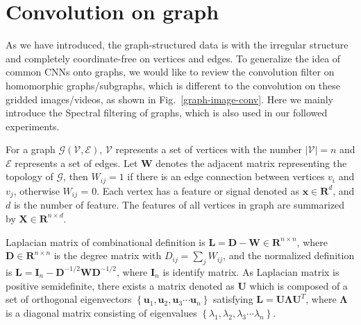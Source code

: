 \documentclass[journal]{IEEEtran}
\begin{document}
\begin{figure*}[ht]
	\centering
	\vspace{-1em}
	\caption{Different convolution operations on graph (left) and gridded image (right) samples.
	(a) shows the 1-localized convolution on graph data, where the red node has 6 adjacencies, and the green node has 3 adjacencies. In the process of convolution, they use the features of the 6 and 3 nodes respectively, in addition to the feature of their own nodes. 	
	(b) shows the convolution operation on the regular gridded data (e.g., images and videos). As long as a fixed-size convolution kernel is given, the convolution kernel will slid from left-to-right and top-to-bottom, all vertices can be then convolved once.}
	\label{graph-image-conv}
	\vspace{-1em}
\end{figure*}

\section{Convolution on graph}
\label{sec:Convolution on graph}

As we have introduced, the graph-structured data is with the irregular structure and completely coordinate-free on vertices and edges.
To generalize the idea of common CNNs onto graphs, we would like to review the convolution filter on homomorphic graphs/subgraphs, which is different to the convolution on these gridded images/videos, as shown in Fig.~\ref{graph-image-conv}.
Here we mainly introduce the Spectral filtering of graphs, which is also used in our followed experiments.

For a graph $\mathcal{G} \left(\mathcal{V},\mathcal{E} \right)$, $\mathcal{V}$ represents a set of vertices with the number $|\mathcal{V} |= n $ and $\mathcal{E}$ represents a set of edges.  Let $\mathbf{W}$ denotes the adjacent matrix representing the topology of $\mathcal{G}$, then $W_{ij} = 1$ if  there is an edge connection between vertices $v_i$ and $v_j$,  otherwise $W_{ij}$ = 0. Each vertex has a feature or signal denoted as  $\mathbf{x}\in\mathbf{R}^{d}$, and $d$ is the number of feature. The features of all vertices in graph are summarized by $\mathbf{X}\in\mathbf{R}^{{n}\times{d}}$.



Laplacian matrix of combinational definition is $\mathbf{L=D-W}\in\mathbf{R}^{n \times n}$, where $\mathbf{D} \in \mathbf{R}^{n \times n}$ is the degree matrix with $D_{ij} = \sum_{j}W_{ij}$, and the normalized definition is $\mathbf{L=I}_{n}-\mathbf{D}^{{-1/2}}\mathbf{W} \mathbf{D}^{-1/2}$, where $\mathbf{I}_{n}$ is identify matrix. As Laplacian matrix is positive semidefinite, there exists a matrix denoted as $\mathbf{U}$ which is composed of a set of orthogonal eigenvectors $\left\{ {\mathbf{u}_1,\mathbf{u}_2,\mathbf{u}_3 \cdots \mathbf{u}_n} \right\}$ satisfying  $\mathbf{L = U \Lambda} \mathbf{U}^T$, where $\mathbf{\Lambda}$ is a diagonal matrix consisting of eigenvalues  $\left\{ {\lambda_1,\lambda_2,\lambda_3 \cdots \lambda_n} \right\}$.
\end{document}

